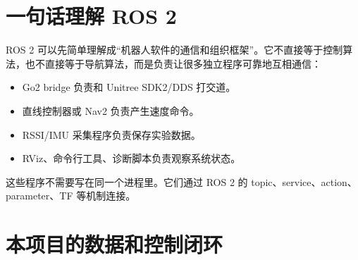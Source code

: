 \documentclass[UTF8,11pt,a4paper,openany]{ctexrep}
\begin{document}
\section{一句话理解 ROS 2}

ROS 2 可以先简单理解成“机器人软件的通信和组织框架”。它不直接等于控制算法，也不直接等于导航算法，而是负责让很多独立程序可靠地互相通信：

\begin{itemize}
  \item Go2 bridge 负责和 Unitree SDK2/DDS 打交道。
  \item 直线控制器或 Nav2 负责产生速度命令。
  \item RSSI/IMU 采集程序负责保存实验数据。
  \item RViz、命令行工具、诊断脚本负责观察系统状态。
\end{itemize}

这些程序不需要写在同一个进程里。它们通过 ROS 2 的 topic、service、action、parameter、TF 等机制连接。

\section{本项目的数据和控制闭环}
\end{document}
